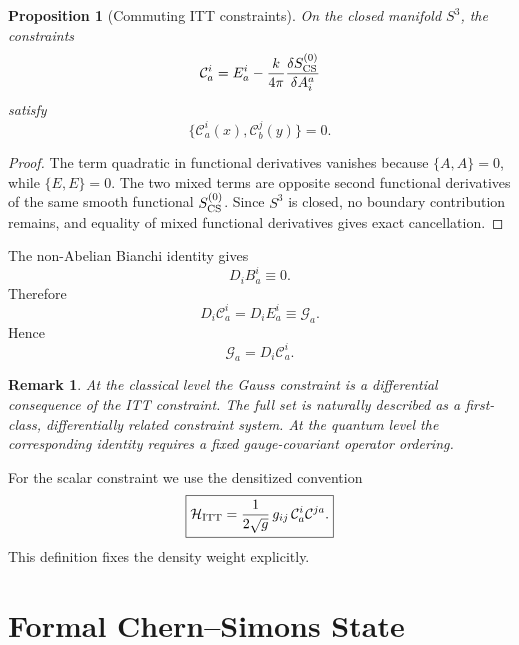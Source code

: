 \documentclass[11pt,a4paper]{article}
\newtheorem{proposition}[definition]{Proposition}
\newtheorem{remark}[definition]{Remark}
\begin{document}
\begin{proposition}[Commuting ITT constraints]
On the closed manifold $S^3$, the constraints
\begin{equation}
\mathcal C_a^i
=
E_a^i-
\frac{k}{4\pi}
\frac{\delta S_{\rm CS}^{(0)}}{\delta A_i^a}
\end{equation}
satisfy
\begin{equation}
\boxed{
\{\mathcal C_a^i(x),\mathcal C_b^j(y)\}=0.
}
\end{equation}
\end{proposition}

\begin{proof}
The term quadratic in functional derivatives vanishes because $\{A,A\}=0$, while $\{E,E\}=0$. The two mixed terms are opposite second functional derivatives of the same smooth functional $S_{\rm CS}^{(0)}$. Since $S^3$ is closed, no boundary contribution remains, and equality of mixed functional derivatives gives exact cancellation.
\end{proof}

The non-Abelian Bianchi identity gives
\begin{equation}
D_iB_a^i\equiv0.
\end{equation}
Therefore
\begin{equation}
D_i\mathcal C_a^i
=
D_iE_a^i
\equiv
\mathcal G_a.
\end{equation}
Hence
\begin{equation}
\boxed{
\mathcal G_a=D_i\mathcal C_a^i.
}
\end{equation}

\begin{remark}
At the classical level the Gauss constraint is a differential consequence of the ITT constraint. The full set is naturally described as a first-class, differentially related constraint system. At the quantum level the corresponding identity requires a fixed gauge-covariant operator ordering.
\end{remark}

For the scalar constraint we use the densitized convention
\begin{equation}
\boxed{
\mathcal H_{\rm ITT}
=
\frac{1}{2\sqrt g}
\,g_{ij}\,
\mathcal C_a^i\mathcal C^{ja}.
}
\end{equation}
This definition fixes the density weight explicitly.

\section{Formal Chern--Simons State}
\end{document}
